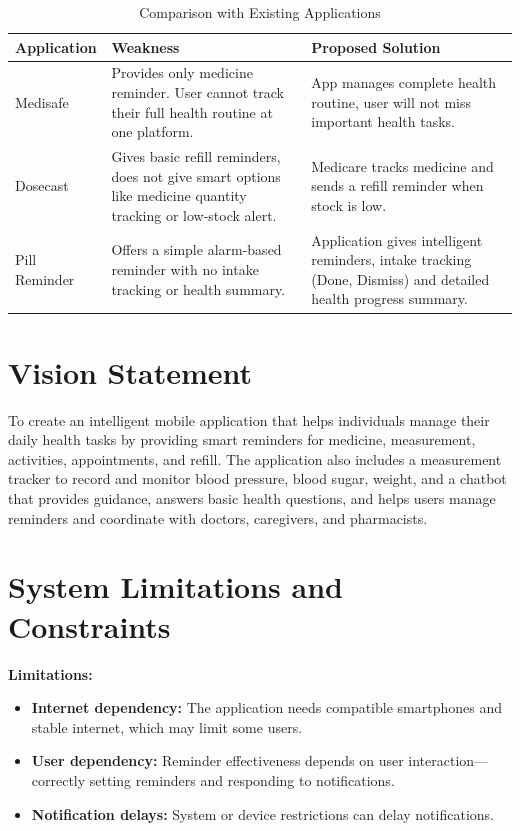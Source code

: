\documentclass[12pt, a4paper, oneside]{report}
\begin{document}
\begin{table}[H]
\centering
\caption{Comparison with Existing Applications}
\label{tab:comparison}
\begin{tabularx}{\textwidth}{|l|X|X|}
\hline
\textbf{Application} & \textbf{Weakness} & \textbf{Proposed Solution} \\ \hline
Medisafe & Provides only medicine reminder. User cannot track their full health routine at one platform. & App manages complete health routine, user will not miss important health tasks. \\ \hline
Dosecast & Gives basic refill reminders, does not give smart options like medicine quantity tracking or low-stock alert. & Medicare tracks medicine and sends a refill reminder when stock is low. \\ \hline
Pill Reminder & Offers a simple alarm-based reminder with no intake tracking or health summary. & Application gives intelligent reminders, intake tracking (Done, Dismiss) and detailed health progress summary. \\ \hline
\end{tabularx}
\end{table}

\section{Vision Statement}
\label{sec:vision}

To create an intelligent mobile application that helps individuals manage their daily health tasks by providing smart reminders for medicine, measurement, activities, appointments, and refill. The application also includes a measurement tracker to record and monitor blood pressure, blood sugar, weight, and a chatbot that provides guidance, answers basic health questions, and helps users manage reminders and coordinate with doctors, caregivers, and pharmacists.

\section{System Limitations and Constraints}
\label{sec:limitations}

\textbf{Limitations:}
\begin{itemize}
    \item \textbf{Internet dependency:} The application needs compatible smartphones and stable internet, which may limit some users.
    \item \textbf{User dependency:} Reminder effectiveness depends on user interaction---correctly setting reminders and responding to notifications.
    \item \textbf{Notification delays:} System or device restrictions can delay notifications.
\end{itemize}
\end{document}
